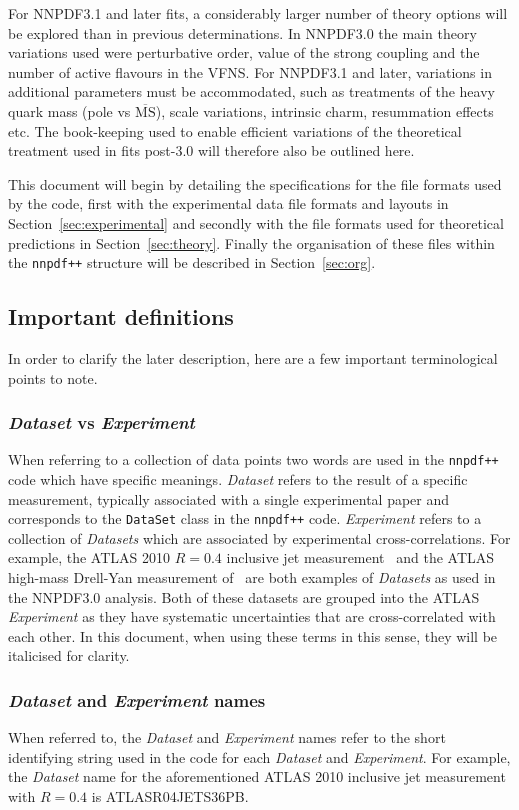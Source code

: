 \documentclass[11pt]{article}
\begin{document}
For NNPDF3.1 and later fits, a considerably larger number of theory options will be explored than in previous determinations. In NNPDF3.0 the main theory variations used were perturbative order, value of the strong coupling and the number of active flavours in the VFNS. For NNPDF3.1 and later, variations in additional parameters must be accommodated, such as treatments of the heavy quark mass (pole vs $\overline{\mathrm{MS}}$), scale variations,  intrinsic charm, resummation effects etc. The book-keeping used to enable efficient variations of the theoretical treatment used in fits post-3.0 will therefore also be outlined here.

This document will begin by detailing the specifications for the file formats used by the code, first with the experimental data file formats and layouts in Section~\ref{sec:experimental} and secondly with the file formats used for theoretical predictions in Section~\ref{sec:theory}. Finally the organisation of these files within the {\tt nnpdf++} structure will be described in Section~\ref{sec:org}.

\subsection{Important definitions}
In order to clarify the later description, here are a few important terminological points to note.

\subsubsection*{\emph{Dataset} vs \emph{Experiment}}
When referring to a collection of data points two words are used in the {\tt nnpdf++} code which have specific meanings.
\emph{Dataset} refers to the result of a specific measurement, typically associated with a single experimental paper and corresponds to the {\tt DataSet} class in the {\tt nnpdf++} code. \emph{Experiment} refers
to a collection of \emph{Datasets} which are associated by experimental cross-correlations. For example, the ATLAS 2010 $R=0.4$ inclusive jet measurement~\cite{Aad:2011fc}
and the ATLAS high-mass Drell-Yan measurement of~\cite{Aad:2013iua} are both examples of \emph{Datasets} as used in the NNPDF3.0 analysis. Both of these datasets are
grouped into the ATLAS \emph{Experiment} as they have systematic uncertainties that are cross-correlated with each other. In this document, when using these terms in
this sense, they will be italicised for clarity.

\subsubsection*{\emph{Dataset} and \emph{Experiment} names}
When referred to, the \emph{Dataset} and \emph{Experiment} names refer to the short identifying string used in the code for each \emph{Dataset} and \emph{Experiment}.
For example, the \emph{Dataset} name for the aforementioned ATLAS 2010 inclusive jet measurement with $R=0.4$ is \mbox{ATLASR04JETS36PB}.
\end{document}

